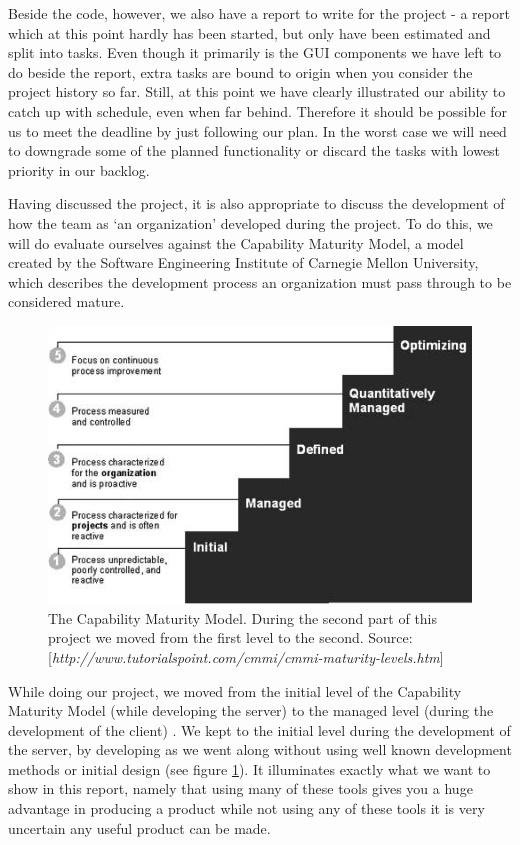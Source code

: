 Beside the code, however, we also have a report to write for the project - a report which at this point hardly has been started, but only have been estimated and split into tasks.
Even though it primarily is the GUI components we have left to do beside the report, extra tasks are bound to origin when you consider the project history so far. Still, at this point we have clearly illustrated our ability to catch up with schedule, even when far behind. Therefore it should be possible for us to meet the deadline by just following our plan. In the worst case we will need to downgrade some of the planned functionality or discard the tasks with lowest priority in our backlog.

Having discussed the project, it is also appropriate to discuss the development of how the team as `an organization' developed during the project. To do this, we will do evaluate ourselves against the Capability Maturity Model, a model created by the Software Engineering Institute of Carnegie Mellon University, which describes the development process an organization must pass through to be considered mature.

\begin{figure}[t]
  \includegraphics[width=\textwidth]{illustrations/CMM.jpg}
  \caption{The Capability Maturity Model. During the second part of this project we moved from the first level to the second. Source: [\textit{http://www.tutorialspoint.com/cmmi/cmmi-maturity-levels.htm}]}
  \label{fig:Capability_Maturity_Model}
\end{figure}

While doing our project, we moved from the initial level of the Capability Maturity Model (while developing the server) to the managed level (during the development of the client) \cite[p. 242]{PM}. We kept to the initial level during the development of the server, by developing as we went along without using well known development methods or initial design (see figure \ref{fig:Capability_Maturity_Model}). It illuminates exactly what we want to show in this report, namely that using many of these tools gives you a huge advantage in producing a product while not using any of these tools it is very uncertain any useful product can be made.